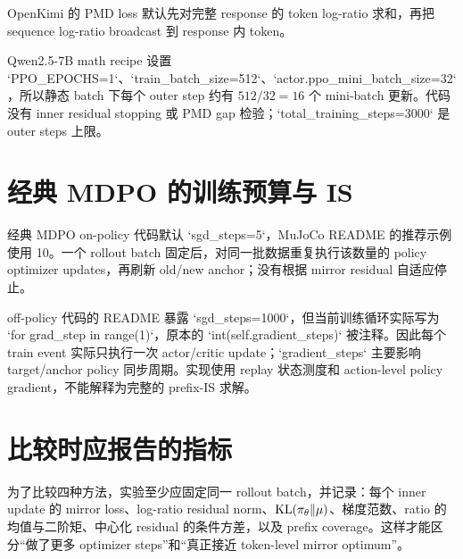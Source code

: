 OpenKimi 的 PMD loss 默认先对完整 response 的 token log-ratio 求和，再把 sequence log-ratio broadcast 到 response 内 token。\par Qwen2.5-7B math recipe 设置 `PPO\_EPOCHS=1`、`train\_batch\_size=512`、`actor.ppo\_mini\_batch\_size=32`，所以静态 batch 下每个 outer step 约有 $512/32=16$ 个 mini-batch 更新。代码没有 inner residual stopping 或 PMD gap 检验；`total\_training\_steps=3000` 是 outer steps 上限。

\section{经典 MDPO 的训练预算与 IS}
\label{sec:mdpo-implementation}

经典 MDPO on-policy 代码默认 `sgd\_steps=5`，MuJoCo README 的推荐示例使用 10。一个 rollout batch 固定后，对同一批数据重复执行该数量的 policy optimizer updates，再刷新 old/new anchor；没有根据 mirror residual 自适应停止。

off-policy 代码的 README 暴露 `sgd\_steps=1000`，但当前训练循环实际写为 `for grad\_step in range(1)`，原本的 `int(self.gradient\_steps)` 被注释。因此每个 train event 实际只执行一次 actor/critic update；`gradient\_steps` 主要影响 target/anchor policy 同步周期。实现使用 replay 状态测度和 action-level policy gradient，不能解释为完整的 prefix-IS 求解。

\section{比较时应报告的指标}
\label{sec:reporting}

为了比较四种方法，实验至少应固定同一 rollout batch，并记录：每个 inner update 的 mirror loss、log-ratio residual norm、$\operatorname{KL}(\pi_\theta\Vert\mu)$、梯度范数、ratio 的均值与二阶矩、中心化 residual 的条件方差，以及 prefix coverage。这样才能区分“做了更多 optimizer steps”和“真正接近 token-level mirror optimum”。
